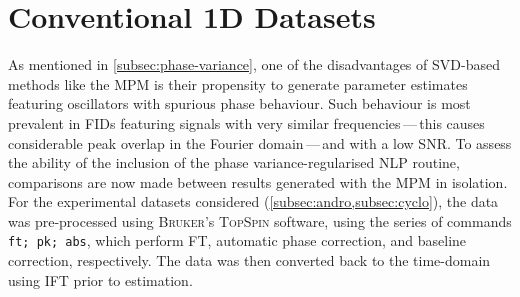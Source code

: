 \section{Conventional \ac{1D} Datasets}
\label{sec:evaluation}

As mentioned in \cref{subsec:phase-variance}, one of the disadvantages of
\ac{SVD}-based methods like the \ac{MPM} is their propensity to generate
parameter estimates featuring oscillators with spurious phase behaviour. Such
behaviour is most prevalent in \acp{FID} featuring signals with very similar
frequencies\,---\,this causes considerable peak overlap in the Fourier
domain\,---\,and with a low \ac{SNR}. To assess the ability of the inclusion of the
phase variance-regularised \ac{NLP} routine,
comparisons are now made between results generated with the \ac{MPM} in
isolation. For
the experimental datasets considered (\cref{subsec:andro,subsec:cyclo}), the
data was pre-processed using \textsc{Bruker}'s \textsc{TopSpin} software, using
the series of commands \texttt{ft; pk; abs}, which perform \ac{FT}, automatic
phase correction, and baseline correction, respectively. The data was then
converted back to the time-domain using \ac{IFT} prior to estimation.

